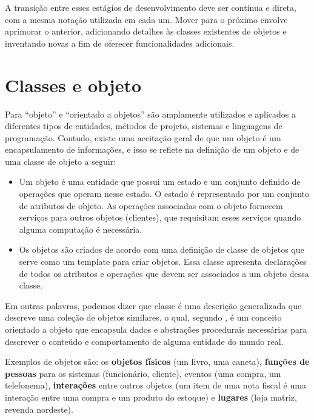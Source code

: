 A transição entre esses estágios de desenvolvimento deve ser contínua e direta,
com a mesma notação utilizada em cada um. Mover para o próximo envolve aprimorar o anterior, adicionando detalhes às classes existentes de objetos e inventando novas a fim de oferecer funcionalidades adicionais.

\section{Classes e objeto}

Para \cite{sommerville2003engenharia} ``objeto'' e ``orientado a objetos'' são
amplamente utilizados e aplicados a diferentes tipos de entidades, métodos de
projeto, sistemas e linguagens de programação. Contudo, existe uma aceitação
geral de que um objeto é um encapsulamento de informações, e isso se reflete na
definição de um objeto e de uma classe de objeto a seguir:

\begin{itemize}
  \item Um objeto é uma entidade que possui um estado e um conjunto definido de
  operações que operam nesse estado. O estado é representado por um conjunto de
  atributos de objeto. As operações associadas com o objeto fornecem serviços para outros objetos (clientes), que requisitam esses serviços quando alguma computação é necessária.

  \item Os objetos são criados de acordo com uma definição de classe de objetos 
  que serve como um template para criar objetos. Essa classe apresenta 
  declarações de todos os atributos e operações que devem ser associados a um 
  objeto dessa classe.
\end{itemize}

Em outras palavras, podemos dizer que classe é uma descrição generalizada que
descreve uma coleção de objetos similares, o qual, segundo 
, é um conceito orientado a objeto que 
encapsula dados e abstrações procedurais necessárias para descrever o conteúdo 
e comportamento de alguma entidade do mundo real.

Exemplos de objetos são: os \textbf{objetos físicos} (um livro, uma caneta), \textbf{funções de pessoas} para os sistemas (funcionário, cliente), eventos (uma compra, um  telefonema), \textbf{interações} entre outros objetos (um item de uma nota fiscal é uma interação entre uma compra e um produto do estoque) e \textbf{lugares} (loja matriz, revenda nordeste).

